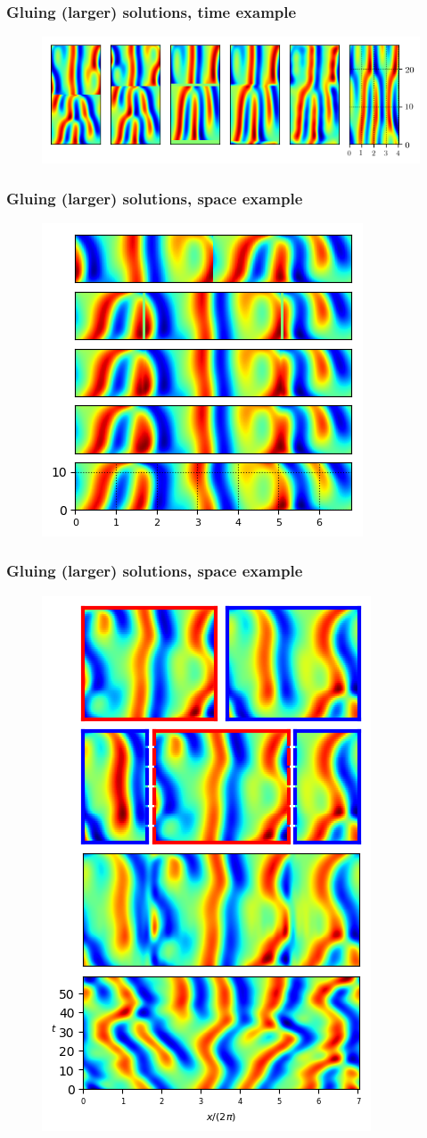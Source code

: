 \documentclass[mathserif, handout]{beamer}
\begin{document}
\begin{frame}%
  \frametitle{Gluing (larger) solutions, time example}
  \begin{figure}
  \includegraphics[width=.9\textwidth]{MNG_ppo1ppo2_time}
  \end{figure}
\end{frame}

\begin{frame}%
  \frametitle{Gluing (larger) solutions, space example}
  \begin{figure}
  \includegraphics[width=.6\textwidth]{MNG_ppo1ppo2_space}
  \end{figure}
\end{frame}

\begin{frame}%
  \frametitle{Gluing (larger) solutions, space example}
  \begin{figure}
  \includegraphics[width=.3\textwidth]{MNG_ppo4ppo3_space}
  \end{figure}
\end{frame}
\end{document}
